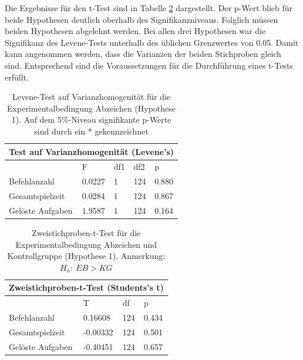 Die Ergebnisse für den t-Test sind in Tabelle \ref{ttest_hypo_1} dargestellt. Der p-Wert blieb für beide Hypothesen deutlich oberhalb des Signifikanzniveaus. Folglich müssen beiden Hypothesen abgelehnt werden. Bei allen drei Hypothesen war die Signifikanz des Levene-Tests unterhalb des üblichen Grenzwertes von 0.05. Damit kann angenommen werden, dass die Varianzen der beiden Stichproben gleich sind. Entsprechend sind die Voraussetzungen für die Durchführung eines t-Tests erfüllt.

\begin{table}[htbp]
\centering
\begin{tabular}{ |p{4cm}||p{2.0cm}|p{2.0cm}|p{2.0cm}|p{2.0cm}| }
 \hline
 \multicolumn{5}{|c|}{Test auf Varianzhomogenität (Levene's)} \\
 \hline
 & F & df1 &df2 &p \\
 \hline
  Befehlanzahl      & 0.0227    & 1 &   124 & 0.880\\
  Gesamtspielzeit   & 0.0284    & 1 &   124 & 0.867\\
  Gelöste Aufgaben  & 1.9587    & 1 &   124 & 0.164\\
 \hline
\end{tabular}
\caption{Levene-Test auf Varianzhomogenität für die Experimentalbedingung Abzeichen (Hypothese 1). Auf dem 5\%-Niveau signifikante p-Werte sind durch ein * gekennzeichnet}
\label{levene_hypo_1}
\end{table}
\begin{table}[htbp]
\centering
\begin{tabular}{ |p{4cm}||p{2.0cm}|p{2.0cm}|p{2.0cm}| }
 \hline
 \multicolumn{4}{|c|}{Zweistichproben-t-Test (Students's t)} \\
 \hline
 & T &df & p \\
 \hline
  Befehlanzahl       & 0.16608  &   124 & 0.434\\
  Gesamtspielzeit    & -0.00332 &   124 & 0.501\\
  Gelöste Aufgaben   & -0.40451 &   124 & 0.657\\
 \hline
\end{tabular}
\caption{Zweistichproben-t-Test für die Experimentalbedingung Abzeichen und Kontrollgruppe (Hypothese 1). Anmerkung: $H_a:\: EB > KG$}
\label{ttest_hypo_1}
\end{table}



